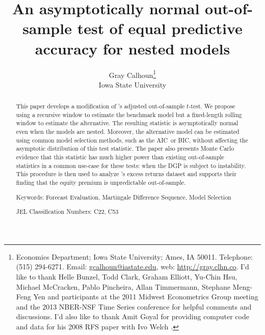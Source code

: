 \documentclass[12pt,fleqn]{article}
\newcommand\citepos[2][]{\citeauthor{#2}'s \citeyearpar[#1]{#2}}
\theoremstyle{definition}
\newcommand{\aic}{AIC}
\newcommand{\bic}{BIC}
\begin{document}
\author{Gray Calhoun\thanks{ Economics Department; Iowa State
    University; Ames, IA 50011.  Telephone: (515) 294-6271.  Email:
    \guillemotleft \protect\url{gcalhoun@iastate.edu}\guillemotright,
    web: \guillemotleft \protect\url{http://gray.clhn.co}\guillemotright.
    I'd like to
    thank Helle Bunzel, Todd Clark, Graham Elliott, Yu-Chin Hsu,
    Michael McCracken, Pablo Pincheira, Allan Timmermann, Stephane
    Meng-Feng Yen and participants at the 2011 Midwest Econometrics
    Group meeting and the 2013 NBER-NSF Time Series conference
    for helpful comments and discussions.  I'd also like to thank Amit
    Goyal for providing computer code and data for his 2008
    RFS paper with Ivo Welch \citep{GoW:08}.}\\%
  Iowa State University}

\title{An asymptotically normal out-of-sample
  test of equal predictive accuracy for nested models} 


\maketitle

\begin{abstract} 
  \noindent This paper develops a modification of \citepos[\textit{J.
    Econom.}]{ClW:07} adjusted out-of-sample $t$-test. We propose
  using a recursive window to estimate the benchmark model but a
  fixed-length rolling window to estimate the alternative. The
  resulting statistic is asymptotically normal even when the models
  are nested.  Moreover, the alternative model can be estimated using
  common model selection methods, such as the \aic\ or \bic, without
  affecting the asymptotic distribution of this test statistic.  The
  paper also presents Monte Carlo evidence that this statistic has
  much higher power than existing out-of-sample statistics in a common
  use-case for these tests: when the DGP is subject to instability.
  This procedure is then used to analyze
  \citepos[\textit{Rev. Finan. Stud.}]{GoW:08} excess returns dataset
  and supports their finding that the equity premium is unpredictable
  out-of-sample.

\strut

\noindent Keywords: Forecast Evaluation, Martingale Difference
Sequence, Model Selection

\strut

\noindent JEL Classification Numbers: C22, C53

\end{abstract}
\end{document}
